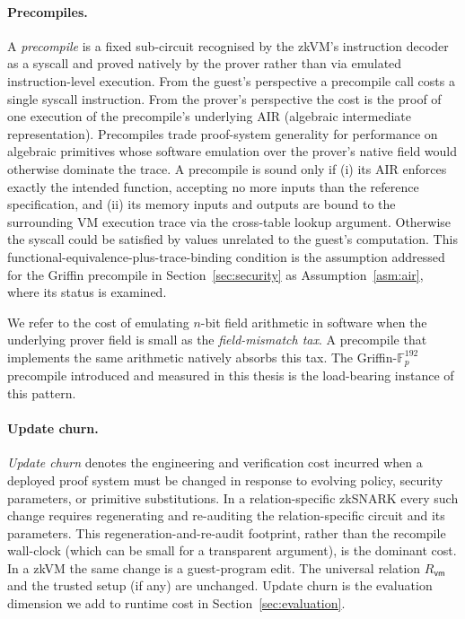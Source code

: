 \paragraph{Precompiles.}
A \emph{precompile} is a fixed sub-circuit recognised by the zkVM's instruction decoder as a syscall and proved natively by the prover rather than via emulated instruction-level execution. From the guest's perspective a precompile call costs a single syscall instruction. From the prover's perspective the cost is the proof of one execution of the precompile's underlying AIR (algebraic intermediate representation). Precompiles trade proof-system generality for performance on algebraic primitives whose software emulation over the prover's native field would otherwise dominate the trace. A precompile is sound only if (i) its AIR enforces exactly the intended function, accepting no more inputs than the reference specification, and (ii) its memory inputs and outputs are bound to the surrounding VM execution trace via the cross-table lookup argument. Otherwise the syscall could be satisfied by values unrelated to the guest's computation. This functional-equivalence-plus-trace-binding condition is the assumption addressed for the Griffin precompile in Section~\ref{sec:security} as Assumption~\ref{asm:air}, where its status is examined.

We refer to the cost of emulating $n$-bit field arithmetic in software when the underlying prover field is small as the \emph{field-mismatch tax}. A precompile that implements the same arithmetic natively absorbs this tax. The Griffin-$\mathbb{F}_p^{192}$ precompile introduced and measured in this thesis is the load-bearing instance of this pattern.

\paragraph{Update churn.}
\emph{Update churn} denotes the engineering and verification cost incurred when a deployed proof system must be changed in response to evolving policy, security parameters, or primitive substitutions. In a relation-specific zkSNARK every such change requires regenerating and re-auditing the relation-specific circuit and its parameters. This regeneration-and-re-audit footprint, rather than the recompile wall-clock (which can be small for a transparent argument), is the dominant cost. In a zkVM the same change is a guest-program edit. The universal relation $R_{\mathsf{vm}}$ and the trusted setup (if any) are unchanged. Update churn is the evaluation dimension we add to runtime cost in Section~\ref{sec:evaluation}.

